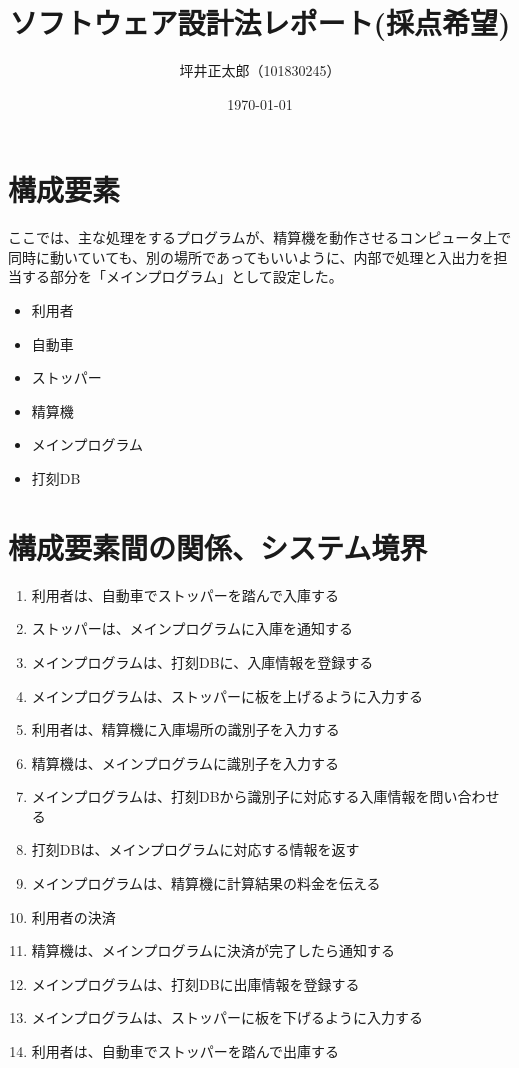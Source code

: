 \documentclass[a4paper,10pt]{jsarticle}
\begin{document}
\title{ソフトウェア設計法レポート(採点希望)}
\author{坪井正太郎（101830245）}
\date{\today}
\maketitle
\section{構成要素}
ここでは、主な処理をするプログラムが、精算機を動作させるコンピュータ上で同時に動いていても、別の場所であってもいいように、内部で処理と入出力を担当する部分を「メインプログラム」として設定した。
\begin{itemize}
  \item 利用者
  \item 自動車
  \item ストッパー
  \item 精算機
  \item メインプログラム
  \item 打刻DB
\end{itemize}

\section{構成要素間の関係、システム境界}

\begin{enumerate}
  \item 利用者は、自動車でストッパーを踏んで入庫する
  \item ストッパーは、メインプログラムに入庫を通知する
  \item メインプログラムは、打刻DBに、入庫情報を登録する
  \item メインプログラムは、ストッパーに板を上げるように入力する\\
  \item 利用者は、精算機に入庫場所の識別子を入力する
  \item 精算機は、メインプログラムに識別子を入力する
  \item メインプログラムは、打刻DBから識別子に対応する入庫情報を問い合わせる
  \item 打刻DBは、メインプログラムに対応する情報を返す
  \item メインプログラムは、精算機に計算結果の料金を伝える
  \item 利用者の決済
  \item 精算機は、メインプログラムに決済が完了したら通知する
  \item メインプログラムは、打刻DBに出庫情報を登録する
  \item メインプログラムは、ストッパーに板を下げるように入力する
  \item 利用者は、自動車でストッパーを踏んで出庫する
\end{enumerate}
\end{document}
